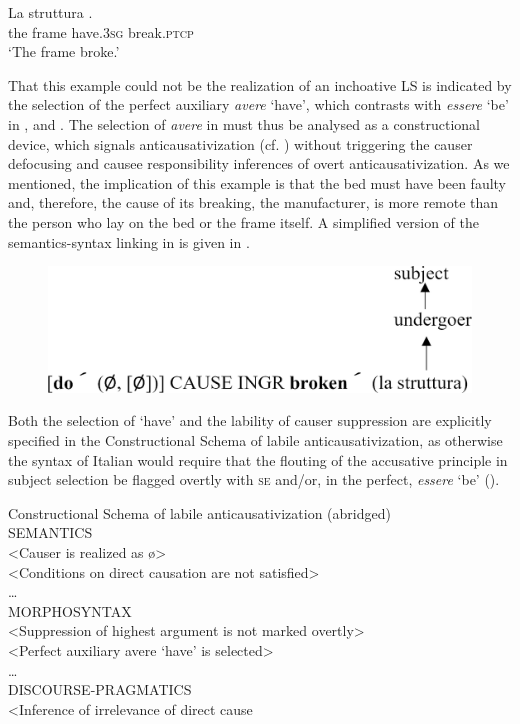 \documentclass[output=paper,colorlinks,citecolor=brown
]{langscibook}
\begin{document}
\ea \label{bentley_example_59}
\gll La		struttura							. \\
			the		frame				have.3\textsc{sg}	break.\textsc{ptcp}	\\
\glt 			‘The frame broke.’
\z

That this example could not be the realization of an inchoative LS is indicated by the selection of the perfect auxiliary \textit{avere} ‘have’, which contrasts with \textit{essere} ‘be’ in ,  and . The selection of \textit{avere} in  must thus be analysed as a constructional device, which signals anticausativization (cf. ) without triggering the causer defocusing and causee responsibility inferences of overt anticausativization. As we mentioned, the implication of this example is that the bed must have been faulty and, therefore, the cause of its breaking, the manufacturer, is more remote than the person who lay on the bed or the frame itself. A simplified version of the semantics-syntax linking in  is given in .

\begin{figure}
\includegraphics[width=.66\textwidth]{figures/bentley_figure4.png}
\caption{}
\label{fig:bentley_figure_4}
\end{figure}    

Both the selection of ‘have’ and the lability of causer suppression are explicitly specified in the Constructional Schema of labile anticausativization, as otherwise the syntax of Italian would require that the flouting of the accusative principle in subject selection be flagged overtly with \textsc{se} and/or, in the perfect, \textit{essere} ‘be’ ().

\ea  \label{bentley_example_60}
Constructional Schema of labile anticausativization (abridged)\\
SEMANTICS\\
<Causer is realized as \o>\\
<Conditions on direct causation are not satisfied>\\
 \ldots \\
MORPHOSYNTAX\\
<Suppression of highest argument is not marked overtly>\\
<Perfect auxiliary avere ‘have’ is selected>\\
 \ldots \\
DISCOURSE-PRAGMATICS\\
<Inference of irrelevance of direct cause
\z
\end{document}
